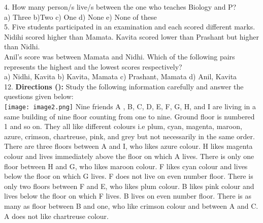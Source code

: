 \documentclass[
]{article}
\begin{document}
4. How many person/s live/s between the one who teaches Biology and P?\\
a) Three \hspace{2mm}b)Two \hspace{2mm}c) One \hspace{2mm}d) None \hspace{2mm}e) None of these\\

5. Five students participated in an examination and each scored different marks. Nidihi
scored higher than Mamata. Kavita scored lower than Prashant but higher than Nidhi.\\
Anil’s score was between Mamata and Nidhi. Which of the following pairs represents
the highest and the lowest scores respectively?\\
a) Nidhi, Kavita \hspace{2mm}b) Kavita, Mamata
\hspace{2mm}c) Prashant, Mamata \hspace{2mm}d) Anil, Kavita\\

12. \textbf{Directions ():} Study the following information carefully and answer the questions given
below:\\
\texttt{[image: image2.png]}
Nine friends A , B, C, D, E, F, G, H, and I are living in a same building of nine floor counting
from one to nine. Ground floor is numbered 1 and so on. They all like different colours i.e
plum, cyan, magenta, maroon, azure, crimson, chartreuse, pink, and grey but not
necessarily in the same order. There are three floors between A and I, who likes azure
colour. H likes magenta colour and lives immediately above the floor on which A lives.
There is only one floor between H and G, who likes maroon colour. F likes cyan colour and
lives below the floor on which G lives. F does not live on even number floor. There is only
two floors between F and E, who likes plum colour. B likes pink colour and lives below the
floor on which F lives. B lives on even number floor. There is as many as floor between B
and one, who like crimson colour and between A and C. A does not like chartreuse colour.\\
\end{document}

